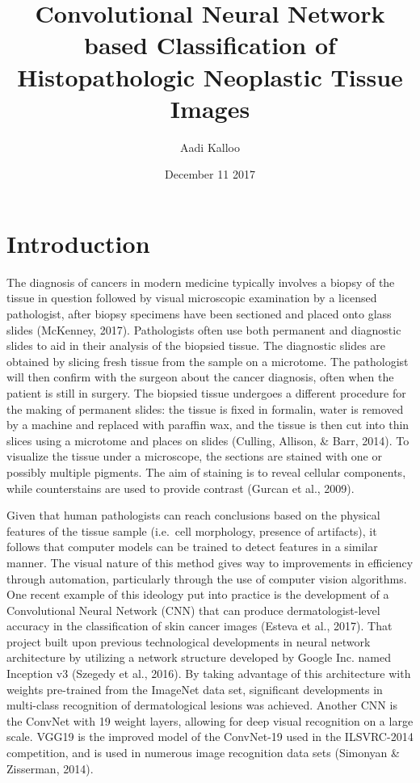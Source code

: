 \documentclass[12pt,]{article}
\title{Convolutional Neural Network based Classification of Histopathologic
Neoplastic Tissue Images}
\author{Aadi Kalloo}
\date{December 11 2017}
\begin{document}
\maketitle

{
\setcounter{tocdepth}{3}
\tableofcontents
}
\newpage

\section{Introduction}\label{introduction}

The diagnosis of cancers in modern medicine typically involves a biopsy
of the tissue in question followed by visual microscopic examination by
a licensed pathologist, after biopsy specimens have been sectioned and
placed onto glass slides (McKenney, 2017). Pathologists often use both
permanent and diagnostic slides to aid in their analysis of the biopsied
tissue. The diagnostic slides are obtained by slicing fresh tissue from
the sample on a microtome. The pathologist will then confirm with the
surgeon about the cancer diagnosis, often when the patient is still in
surgery. The biopsied tissue undergoes a different procedure for the
making of permanent slides: the tissue is fixed in formalin, water is
removed by a machine and replaced with paraffin wax, and the tissue is
then cut into thin slices using a microtome and places on slides
(Culling, Allison, \& Barr, 2014). To visualize the tissue under a
microscope, the sections are stained with one or possibly multiple
pigments. The aim of staining is to reveal cellular components, while
counterstains are used to provide contrast (Gurcan et al., 2009).

Given that human pathologists can reach conclusions based on the
physical features of the tissue sample (i.e.~cell morphology, presence
of artifacts), it follows that computer models can be trained to detect
features in a similar manner. The visual nature of this method gives way
to improvements in efficiency through automation, particularly through
the use of computer vision algorithms. One recent example of this
ideology put into practice is the development of a Convolutional Neural
Network (CNN) that can produce dermatologist-level accuracy in the
classification of skin cancer images (Esteva et al., 2017). That project
built upon previous technological developments in neural network
architecture by utilizing a network structure developed by Google Inc.
named Inception v3 (Szegedy et al., 2016). By taking advantage of this
architecture with weights pre-trained from the ImageNet data set,
significant developments in multi-class recognition of dermatological
lesions was achieved. Another CNN is the ConvNet with 19 weight layers,
allowing for deep visual recognition on a large scale. VGG19 is the
improved model of the ConvNet-19 used in the ILSVRC-2014 competition,
and is used in numerous image recognition data sets (Simonyan \&
Zisserman, 2014).
\end{document}
